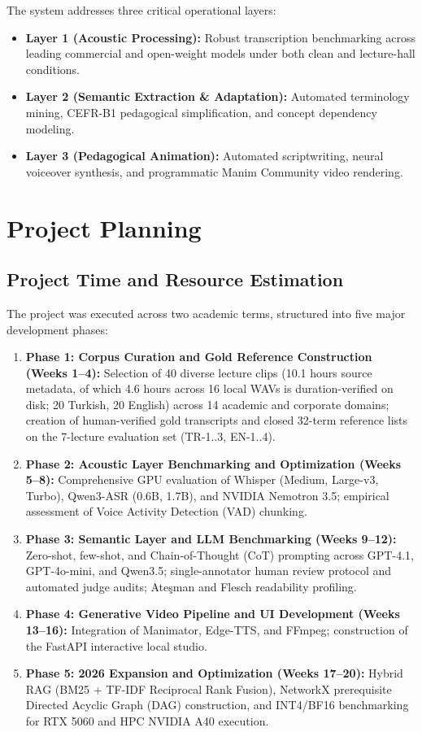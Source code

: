 \documentclass[a4paper,12pt]{report}
\begin{document}
The system addresses three critical operational layers:
\begin{itemize}
    \item \textbf{Layer 1 (Acoustic Processing):} Robust transcription benchmarking across leading commercial and open-weight models under both clean and lecture-hall conditions.
    \item \textbf{Layer 2 (Semantic Extraction \& Adaptation):} Automated terminology mining, CEFR-B1 pedagogical simplification, and concept dependency modeling.
    \item \textbf{Layer 3 (Pedagogical Animation):} Automated scriptwriting, neural voiceover synthesis, and programmatic Manim Community video rendering.
\end{itemize}

\section{Project Planning}

\subsection{Project Time and Resource Estimation}
The project was executed across two academic terms, structured into five major development phases:
\begin{enumerate}
    \item \textbf{Phase 1: Corpus Curation and Gold Reference Construction (Weeks 1--4):} Selection of 40 diverse lecture clips (10.1 hours source metadata, of which 4.6 hours across 16 local WAVs is duration-verified on disk; 20 Turkish, 20 English) across 14 academic and corporate domains; creation of human-verified gold transcripts and closed 32-term reference lists on the 7-lecture evaluation set (TR-1..3, EN-1..4).
    \item \textbf{Phase 2: Acoustic Layer Benchmarking and Optimization (Weeks 5--8):} Comprehensive GPU evaluation of Whisper (Medium, Large-v3, Turbo), Qwen3-ASR (0.6B, 1.7B), and NVIDIA Nemotron 3.5; empirical assessment of Voice Activity Detection (VAD) chunking.
    \item \textbf{Phase 3: Semantic Layer and LLM Benchmarking (Weeks 9--12):} Zero-shot, few-shot, and Chain-of-Thought (CoT) prompting across GPT-4.1, GPT-4o-mini, and Qwen3.5; single-annotator human review protocol and automated judge audits; Ate\c{s}man and Flesch readability profiling.
    \item \textbf{Phase 4: Generative Video Pipeline and UI Development (Weeks 13--16):} Integration of Manimator, Edge-TTS, and FFmpeg; construction of the FastAPI interactive local studio.
    \item \textbf{Phase 5: 2026 Expansion and Optimization (Weeks 17--20):} Hybrid RAG (BM25 + TF-IDF Reciprocal Rank Fusion), NetworkX prerequisite Directed Acyclic Graph (DAG) construction, and INT4/BF16 benchmarking for RTX 5060 and HPC NVIDIA A40 execution.
\end{enumerate}
\end{document}
